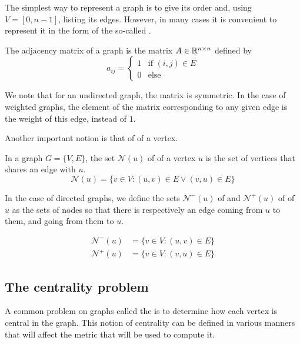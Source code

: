 The simplest way to represent a graph is to give its order and, using $V = [0, n-1]$, listing its edges. However, in many cases it is convenient to represent it in the form of the so-called .

\begin{definition}
    The adjacency matrix of a graph is the matrix $A \in \mathbb{R}^{n\times n}$ defined by
    $$
    a_{ij} = \begin{cases}
        1 & \text{if $(i, j) \in E$}\\
        0 & \text{else}
    \end{cases}$$
\end{definition}

We note that for an undirected graph, the matrix is symmetric. In the case of weighted graphs, the element of the matrix corresponding to any given edge is the weight of this edge, instead of $1$.

Another important notion is that of  of a vertex.
\begin{definition}[Neighbors]
    In a graph $G = \{V, E\}$, the set $\mathcal{N}(u)$ of  of a vertex $u$ is the set of vertices that shares an edge with $u$.
    \begin{equation}
        \mathcal{N}(u) = \{v\in V : (u, v) \in E \vee (v, u) \in E\}
    \end{equation}

    In the case of directed graphs, we define the sets $\mathcal{N}^-(u)$ of  and $\mathcal{N}^+(u)$ of  of $u$ as the sets of nodes so that there is respectively an edge coming from $u$ to them, and going from them to $u$.

    \begin{equation}
        \begin{array}{ll}
            \mathcal{N}^-(u) & = \{v\in V : (u, v) \in E\} \\
            \mathcal{N}^+(u) & = \{v\in V : (v, u) \in E\}
        \end{array}
    \end{equation}
\end{definition}

\subsection{The centrality problem}\label{subsec:Intro_centrality}
A common problem on graphs called the  is to determine how each vertex is central in the graph. This notion of centrality can be defined in various manners that will affect the metric that will be used to compute it.

